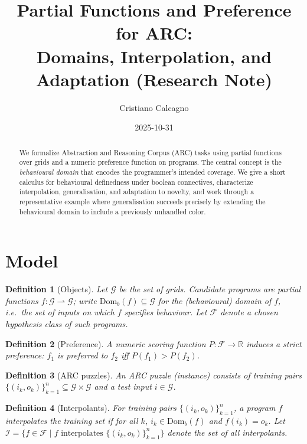 \documentclass[11pt]{article}
\title{Partial Functions and Preference for ARC:\\
Domains, Interpolation, and Adaptation (Research Note)}
\author{Cristiano Calcagno}
\date{2025-10-31}
\newtheorem{definition}{Definition}
\newcommand{\G}{\mathcal{G}}
\newcommand{\F}{\mathcal{F}}
\newcommand{\Domb}{\mathrm{Dom}_b}
\begin{document}
\maketitle

\begin{abstract}
We formalize Abstraction and Reasoning Corpus (ARC) tasks using partial functions over grids and a numeric preference function on programs. The central concept is the \emph{behavioural domain} that encodes the programmer's intended coverage. We give a short calculus for behavioural definedness under boolean connectives, characterize interpolation, generalisation, and adaptation to novelty, and work through a representative example where generalisation succeeds precisely by extending the behavioural domain to include a previously unhandled color.
\end{abstract}

\section{Model}

\begin{definition}[Objects]
Let $\G$ be the set of grids. Candidate programs are partial functions $f:\G\rightharpoonup \G$; write $\Domb(f)\subseteq \G$ for the (behavioural) domain of $f$, i.e.\ the set of inputs on which $f$ \emph{specifies} behaviour. Let $\F$ denote a chosen hypothesis class of such programs.
\end{definition}

\begin{definition}[Preference]
A numeric scoring function $P:\F\to\mathbb{R}$ induces a strict preference: $f_1$ is preferred to $f_2$ iff $P(f_1)>P(f_2)$.
\end{definition}

\begin{definition}[ARC puzzles]
An ARC puzzle (instance) consists of training pairs $\{(i_k,o_k)\}_{k=1}^n\subseteq \G\times\G$ and a test input $i\in\G$.
\end{definition}

\begin{definition}[Interpolants]
For training pairs $\{(i_k,o_k)\}_{k=1}^n$, a program $f$ \emph{interpolates} the training set if for all $k$, $i_k\in\Domb(f)$ and $f(i_k)=o_k$. Let $\mathcal{I}=\{f\in\F\mid f \text{ interpolates } \{(i_k,o_k)\}_{k=1}^n\}$ denote the set of all interpolants.
\end{definition}
\end{document}
